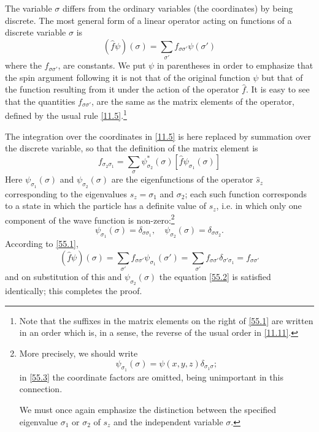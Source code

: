 The variable $\sigma$ differs from the ordinary variables (the coordinates) by being discrete. The most general form of a linear operator acting on functions of a discrete variable $\sigma$ is
\begin{equation}\label{55.1}
\left(\hat{f}\psi \right)(\sigma)=\sum_{\sigma'}f_{\sigma\sigma'}\psi(\sigma')
\end{equation}
where the $ f_{\sigma\sigma'} $, are constants. We put $\psi$  in parentheses in order to emphasize that the spin argument following it is not that of the original function $\psi$ but that of the function resulting from it under the action of the operator $ \hat{f} $. It is easy to see that the quantities $ f_{\sigma\sigma'} $, are the same as the matrix elements of the operator, defined by the usual rule \eqref{11.5}.\footnote{Note that the suffixes in the matrix elements on the right of \eqref{55.1} are written in an order which is, in a sense, the reverse of the usual order in \eqref{11.11}.
}

The integration over the coordinates in \eqref{11.5} is here replaced by summation over the discrete variable, so that the definition of the matrix element is
\begin{equation}\label{55.2}
f_{\sigma_2\sigma_1}=\sum_{\sigma}\psi^*_{\sigma_2}(\sigma)\left[\hat{f}\psi_{\sigma_1}(\sigma) \right]
\end{equation}
Here $ \psi_{\sigma_1}(\sigma) $ and $ \psi_{\sigma_2}(\sigma) $ are the eigenfunctions of the operator $ \hat{s}_z $ corresponding to the eigenvalues $ s_z = \sigma_1 $ and $ \sigma_2 $; each such function corresponds to a state in which the particle has a definite value of $ s_z $, i.e. in which only one component of the wave function is non-zero:\footnote{More precisely, we should write
\[ \psi_{\sigma_1}(\sigma)=\psi(x,y,z)\delta_{\sigma_1\sigma}; \]	
in \eqref{55.3} the coordinate factors are omitted, being unimportant in this connection.
	
We must once again emphasize the distinction between the specified eigenvalue $ \sigma_1 $ or $ \sigma_2 $ of $ s_z $ and the independent variable $\sigma$.
}
\begin{equation}\label{55.3}
\psi_{\sigma_1}(\sigma)=\delta_{\sigma\sigma_1},\quad\psi_{\sigma_2}(\sigma)=\delta_{\sigma\sigma_2}.
\end{equation}
According to \eqref{55.1},
\[ \left(\hat{f}\psi \right)(\sigma)=\sum_{\sigma'}f_{\sigma\sigma'}\psi_{\sigma_1}(\sigma')=\sum_{\sigma'}f_{\sigma\sigma'}\delta_{\sigma'\sigma_1}=f_{\sigma\sigma'} \]
and on substitution of this and $ \psi_{\sigma_2}(\sigma) $ the equation \eqref{55.2} is satisfied identically; this completes the proof.

